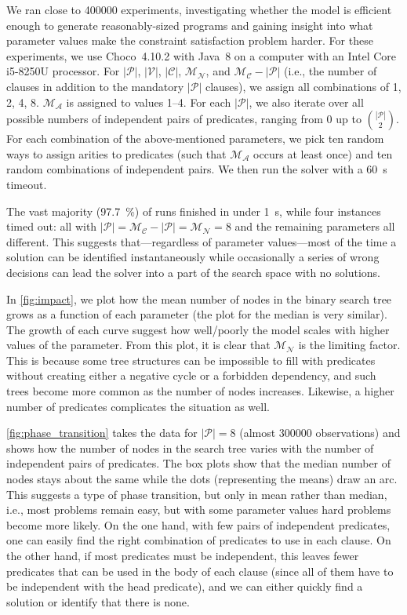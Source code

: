 \documentclass[letterpaper]{article}
\theoremstyle{definition}
\newcommand{\predicates}{\mathcal{P}}
\newcommand{\variables}{\mathcal{V}}
\newcommand{\constants}{\mathcal{C}}
\newcommand{\maxArity}{\mathcal{M}_{\mathcal{A}}}
\newcommand{\maxNumNodes}{\mathcal{M}_{\mathcal{N}}}
\newcommand{\maxNumClauses}{\mathcal{M}_{\mathcal{C}}}
\begin{document}
We ran close to \num{400000} experiments, investigating whether the model is
efficient enough to generate reasonably-sized programs and gaining insight into
what parameter values make the constraint satisfaction problem harder. For these
experiments, we use Choco~4.10.2 \citep{choco} with Java~8 on a computer with an
Intel Core i5-8250U processor. For $|\predicates{}|$, $|\variables{}|$,
$|\constants{}|$, $\maxNumNodes{}$, and $\maxNumClauses{} - |\predicates{}|$
(i.e., the number of clauses in addition to the mandatory $|\predicates{}|$
clauses), we assign all combinations of 1, 2, 4, 8. $\maxArity{}$ is assigned to
values 1--4. For each $|\predicates{}|$, we also iterate over all possible
numbers of independent pairs of predicates, ranging from 0 up to
$\binom{|\predicates{}|}{2}$. For each combination of the above-mentioned
parameters, we pick ten random ways to assign arities to predicates (such that
$\maxArity{}$ occurs at least once) and ten random combinations of independent
pairs. We then run the solver with a \SI{60}{\second} timeout.

The vast majority (\SI{97.7}{\percent}) of runs finished in under
\SI{1}{\second}, while four instances timed out: all with $|\predicates| =
\maxNumClauses{} - |\predicates{}| = \maxNumNodes{} = 8$ and the remaining
parameters all different. This suggests that---regardless of parameter
values---most of the time a solution can be identified instantaneously while
occasionally a series of wrong decisions can lead the solver into a part of the
search space with no solutions.

In \cref{fig:impact}, we plot how the mean number of nodes in the binary search
tree grows as a function of each parameter (the plot for the median is very
similar). The growth of each curve suggest how well/poorly the model scales with
higher values of the parameter. From this plot, it is clear that
$\maxNumNodes{}$ is the limiting factor. This is because some tree structures
can be impossible to fill with predicates without creating either a negative
cycle or a forbidden dependency, and such trees become more common as the number
of nodes increases. Likewise, a higher number of predicates complicates the
situation as well.

\cref{fig:phase_transition} takes the data for $|\predicates{}| = 8$ (almost
\num{300000} observations) and shows how the number of nodes in the search tree
varies with the number of independent pairs of predicates. The box plots show
that the median number of nodes stays about the same while the dots
(representing the means) draw an arc. This suggests a type of phase transition,
but only in mean rather than median, i.e., most problems remain easy, but with
some parameter values hard problems become more likely. On the one hand, with
few pairs of independent predicates, one can easily find the right combination
of predicates to use in each clause. On the other hand, if most predicates must
be independent, this leaves fewer predicates that can be used in the body of
each clause (since all of them have to be independent with the head predicate),
and we can either quickly find a solution or identify that there is none.
\end{document}
